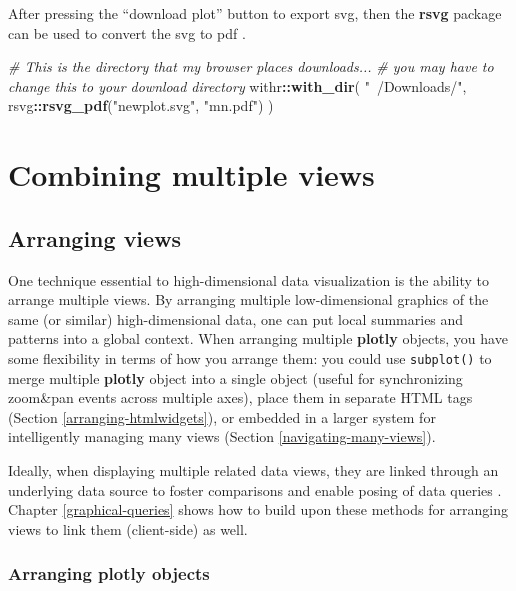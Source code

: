 \documentclass[
  12pt,
]{krantz}
\newenvironment{Shaded}{\begin{snugshade}}{\end{snugshade}}
\newcommand{\CommentTok}[1]{\textcolor[rgb]{0.56,0.35,0.01}{\textit{#1}}}
\newcommand{\KeywordTok}[1]{\textcolor[rgb]{0.13,0.29,0.53}{\textbf{#1}}}
\newcommand{\NormalTok}[1]{#1}
\newcommand{\OperatorTok}[1]{\textcolor[rgb]{0.81,0.36,0.00}{\textbf{#1}}}
\newcommand{\StringTok}[1]{\textcolor[rgb]{0.31,0.60,0.02}{#1}}
\begin{document}
After pressing the ``download plot'' button to export svg, then the \textbf{rsvg} package can be used to convert the svg to pdf \citep{rsvg}.

\begin{Shaded}
\begin{Highlighting}[]
\CommentTok{# This is the directory that my browser places downloads...}
\CommentTok{# you may have to change this to your download directory}
\NormalTok{withr}\OperatorTok{::}\KeywordTok{with_dir}\NormalTok{(}
  \StringTok{"~/Downloads/"}\NormalTok{, }
\NormalTok{  rsvg}\OperatorTok{::}\KeywordTok{rsvg_pdf}\NormalTok{(}\StringTok{"newplot.svg"}\NormalTok{, }\StringTok{"mn.pdf"}\NormalTok{)}
\NormalTok{)}
\end{Highlighting}
\end{Shaded}

\hypertarget{part-combining-multiple-views}{%
\part{Combining multiple views}\label{part-combining-multiple-views}}

\hypertarget{arranging-views}{%
\chapter{Arranging views}\label{arranging-views}}

One technique essential to high-dimensional data visualization is the ability to arrange multiple views. By arranging multiple low-dimensional graphics of the same (or similar) high-dimensional data, one can put
local summaries and patterns into a global context. When arranging multiple \textbf{plotly} objects, you have some flexibility in terms of how you arrange them: you could use \texttt{subplot()} to merge multiple \textbf{plotly} object into a single object (useful for synchronizing zoom\&pan events across multiple axes), place them in separate HTML tags (Section \ref{arranging-htmlwidgets}), or embedded in a larger system for intelligently managing many views (Section \ref{navigating-many-views}).

Ideally, when displaying multiple related data views, they are linked through an underlying data source to foster comparisons and enable posing of data queries \citep{Cook:2007uk}. Chapter \ref{graphical-queries} shows how to build upon these methods for arranging views to link them (client-side) as well.

\hypertarget{arranging-plotly-objects}{%
\section{Arranging plotly objects}\label{arranging-plotly-objects}}
\end{document}
